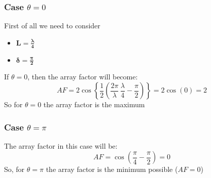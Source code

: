 \subsubsection*{Case $\theta=0$}
First of all we need to consider
\begin{itemize}
    \item $\bm{L=\frac{\lambda}{4}}$
    \item $\bm{\delta=\frac{\pi}{2}}$
\end{itemize}
If $\theta=0$, then the array factor will become:
\begin{equation}
    AF=2\cos\left\{\frac{1}{2}\left(\frac{2\pi}{\lambda}\,\frac{\lambda}{4}-\frac{\pi}{2}\right)\right\}=2\cos(0)=2
\end{equation}
So for $\theta=0$ the array factor is the maximum
\subsubsection*{Case $\theta=\pi$}
The array factor in this case will be:
\begin{equation}
    AF=\cos\left(\frac{\pi}{4}-\frac{\pi}{2}\right)=0
\end{equation}
So, for $\theta=\pi$ the array factor is the minimum possible ($AF=0$)
